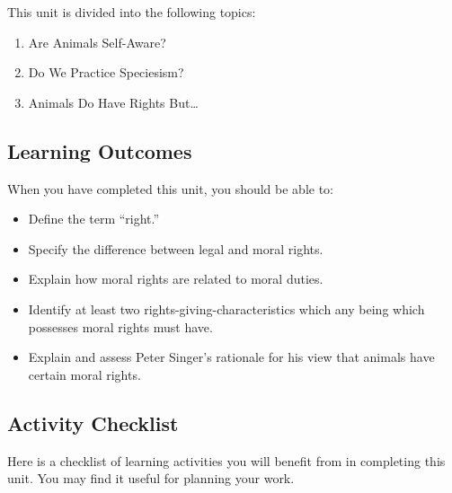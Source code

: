 \documentclass[
]{book}
\providecommand{\tightlist}{%
  \setlength{\itemsep}{0pt}\setlength{\parskip}{0pt}}
\begin{document}
This unit is divided into the following topics:

\begin{enumerate}
\def\labelenumi{\arabic{enumi}.}
\tightlist
\item
  Are Animals Self-Aware?
\item
  Do We Practice Speciesism?
\item
  Animals Do Have Rights But\ldots{}
\end{enumerate}

\hypertarget{learning-outcomes-4}{%
\subsection*{Learning Outcomes}\label{learning-outcomes-4}}

When you have completed this unit, you should be able to:

\begin{itemize}
\tightlist
\item
  Define the term ``right.''
\item
  Specify the difference between legal and moral rights.
\item
  Explain how moral rights are related to moral duties.
\item
  Identify at least two rights-giving-characteristics which any being which possesses moral rights must have.
\item
  Explain and assess Peter Singer's rationale for his view that animals have certain moral rights.
\end{itemize}

\hypertarget{activity-checklist-4}{%
\subsection*{Activity Checklist}\label{activity-checklist-4}}

Here is a checklist of learning activities you will benefit from in completing this unit. You may find it useful for planning your work.
\end{document}
